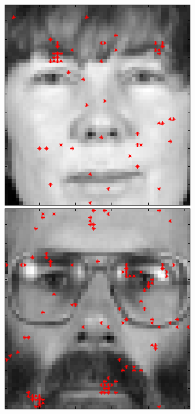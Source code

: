 \documentclass[a4paper,10pt]{article}
\begin{document}
\begin{figure}[ht]
 \includegraphics[width=\textwidth*11/100]{figures/XM2VTS_Full_7.png}
 \includegraphics[width=\textwidth*11/100]{figures/XM2VTS_Full_8.png}\\

\end{figure}
\end{document}
